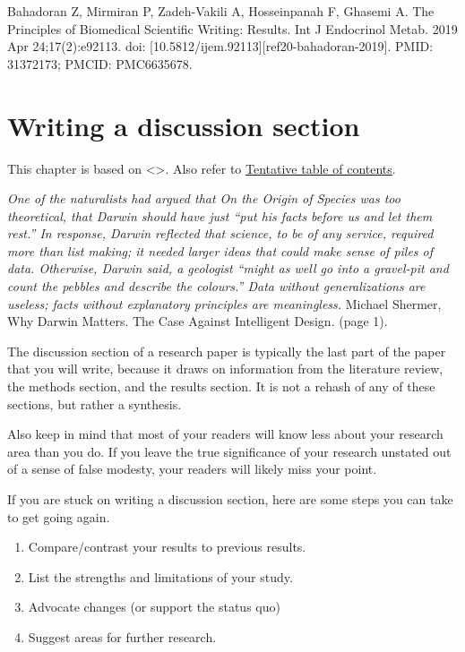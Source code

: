 \documentclass[
  letterpaper,
  DIV=11,
  numbers=noendperiod]{scrreprt}
\providecommand{\tightlist}{%
  \setlength{\itemsep}{0pt}\setlength{\parskip}{0pt}}\usepackage{longtable,booktabs,array}
\begin{document}
Bahadoran Z, Mirmiran P, Zadeh-Vakili A, Hosseinpanah F, Ghasemi A. The
Principles of Biomedical Scientific Writing: Results. Int J Endocrinol
Metab. 2019 Apr 24;17(2):e92113. doi:
{[}10.5812/ijem.92113{]}{[}ref20-bahadoran-2019{]}. PMID: 31372173;
PMCID: PMC6635678.


\chapter{Writing a discussion
section}\label{writing-a-discussion-section}

This chapter is based on \textless{}\textgreater. Also refer to
\href{http://www.pmean.com/10/Contents.html}{Tentative table of
contents}.

\emph{One of the naturalists had argued that On the Origin of Species
was too theoretical, that Darwin should have just ``put his facts before
us and let them rest.'' In response, Darwin reflected that science, to
be of any service, required more than list making; it needed larger
ideas that could make sense of piles of data. Otherwise, Darwin said, a
geologist ``might as well go into a gravel-pit and count the pebbles and
describe the colours.'' Data without generalizations are useless; facts
without explanatory principles are meaningless.} Michael Shermer, Why
Darwin Matters. The Case Against Intelligent Design. (page 1).

The discussion section of a research paper is typically the last part of
the paper that you will write, because it draws on information from the
literature review, the methods section, and the results section. It is
not a rehash of any of these sections, but rather a synthesis.

Also keep in mind that most of your readers will know less about your
research area than you do. If you leave the true significance of your
research unstated out of a sense of false modesty, your readers will
likely miss your point.

If you are stuck on writing a discussion section, here are some steps
you can take to get going again.

\begin{enumerate}
\def\labelenumi{\arabic{enumi}.}
\tightlist
\item
  Compare/contrast your results to previous results.
\item
  List the strengths and limitations of your study.
\item
  Advocate changes (or support the status quo)
\item
  Suggest areas for further research.
\end{enumerate}
\end{document}
